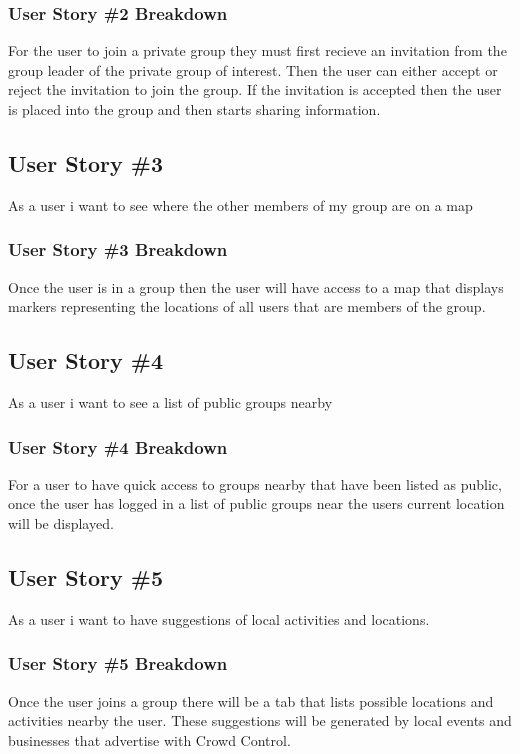 \subsubsection{User Story \#2 Breakdown}
For the user to join a private group they must first recieve an invitation from the group leader of the private group of interest.  Then the user can either accept or reject the invitation to join the group.  If the invitation is accepted then the user is placed into the group and then starts sharing information. 

\subsection{User Story \#3} 
As a user i want to see where the other members of my group are on a map

\subsubsection{User Story \#3 Breakdown}
Once the user is in a group then the user will have access to a map that displays markers representing the locations of all users that are members of the group.

\subsection{User Story \#4} 
As a user i want to see a list of public groups nearby

\subsubsection{User Story \#4 Breakdown}
For a user to have quick access to groups nearby that have been listed as public, once the user has logged in a list of public groups near the users current location will be displayed.

\subsection{User Story \#5} 
As a user i want to have suggestions of local activities and locations.

\subsubsection{User Story \#5 Breakdown}
Once the user joins a group there will be a tab that lists possible locations and activities nearby the user.  These suggestions will be generated by local events and businesses that advertise with Crowd Control.

